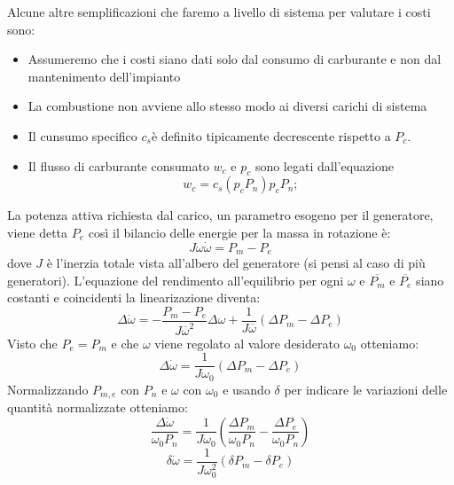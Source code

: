 Alcune altre semplificazioni che faremo a livello di sistema per valutare i costi sono:
\begin{itemize}
\item Assumeremo che i costi siano dati solo dal consumo di carburante e non dal mantenimento dell'impianto
\item La combustione non avviene allo stesso modo ai diversi carichi di sistema
\item Il cunsumo specifico $c_s$è definito tipicamente decrescente rispetto a $P_c$.
\item Il flusso di carburante consumato $w_c$ e $p_c$ sono legati dall'equazione
$$w_c=c_s(p_cP_n)p_cP_n;$$
\end{itemize}
La potenza attiva richiesta dal carico, un parametro esogeno per il generatore, viene detta $P_e$ così il bilancio delle energie per la massa in rotazione è:
$$J\omega\dot{\omega}=P_m-P_e$$
dove $J$ è l'inerzia totale vista all'albero del generatore (si pensi al caso di più generatori).
L'equazione del rendimento all'equilibrio  per ogni $\omega$ e $\overline{P_m}$ e $\overline{P_e}$ siano costanti e coincidenti la linearizazione diventa:
$$\Delta\dot{\omega}=-\frac{P_m-P_e}{J\overline{\omega}^2}\Delta\omega+\frac{1}{J\overline{\omega}}(\Delta P_m-\Delta P_e)$$
Visto che $P_e=P_m$ e che $\omega$ viene regolato al valore desiderato $\omega_0$ otteniamo:
$$\Delta\dot{\omega}=\frac{1}{J\omega_0}(\Delta P_m-\Delta P_e)$$
Normalizzando $P_{m,e}$ con $P_n$ e $\omega$ con $\omega_0$ e usando $\delta$ per indicare le variazioni delle quantità normalizzate otteniamo:
$$\frac{\Delta\dot{\omega}}{\omega_0P_n}=\frac{1}{J\omega_0}(\frac{\Delta P_m}{\omega_0P_n}-\frac{\Delta P_e}{\omega_0P_n})$$
$$\delta\dot{\omega}=\frac{1}{J\omega_0^2}(\delta P_m-\delta P_e)$$

